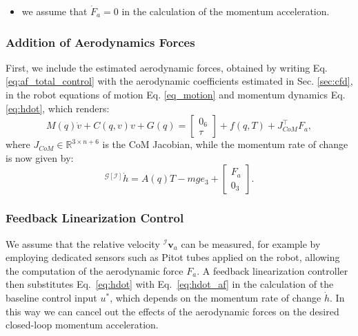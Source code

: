\begin{itemize}
\item we assume that $\dot{F}_a = 0$ in the calculation of the momentum acceleration.
\end{itemize}
\subsubsection*{Addition of Aerodynamics Forces}
First, we include the estimated aerodynamic forces, obtained by writing Eq. \eqref{eq:af_total_control} with the aerodynamic coefficients estimated in Sec. \ref{sec:cfd}, in the robot equations of motion Eq. \eqref{eq_motion} and momentum dynamics Eq. \eqref{eq:hdot}, which renders:
\begin{equation}
\label{eq_motion_af}
  M(q)\dot{v}+C(q,v)v+G(q)=
  \begin{bmatrix}
    0_6\\
    \tau
  \end{bmatrix}
  +f(q,T)+J_{CoM}^{\top}F_a,
\end{equation}
where $J_{CoM} \in \mathbb{R}^{3 \times n+6}$ is the CoM Jacobian, while the momentum rate of change is now given by:
\begin{equation}
\label{eq:hdot_af}
   {}^{\mathcal{G}[\mathcal{I}]}\dot{h}=A(q)T-mge_3+
   \begin{bmatrix}
   F_a\\
   0_3
   \end{bmatrix}.
\end{equation}

\subsubsection*{Feedback Linearization Control}

We assume that the relative velocity ${}^{\mathcal{I}}\boldsymbol{v}_a$ can be measured, for example by employing dedicated sensors such as Pitot tubes applied on the robot, allowing the computation of the aerodynamic force $F_a$. A feedback linearization controller then substitutes Eq.~\eqref{eq:hdot} with Eq.~\eqref{eq:hdot_af} in the calculation of the baseline control input $u^*$, which depends on the momentum rate of change $\dot{h}$. In this way we can cancel out the effects of the aerodynamic forces on the desired closed-loop momentum acceleration.

